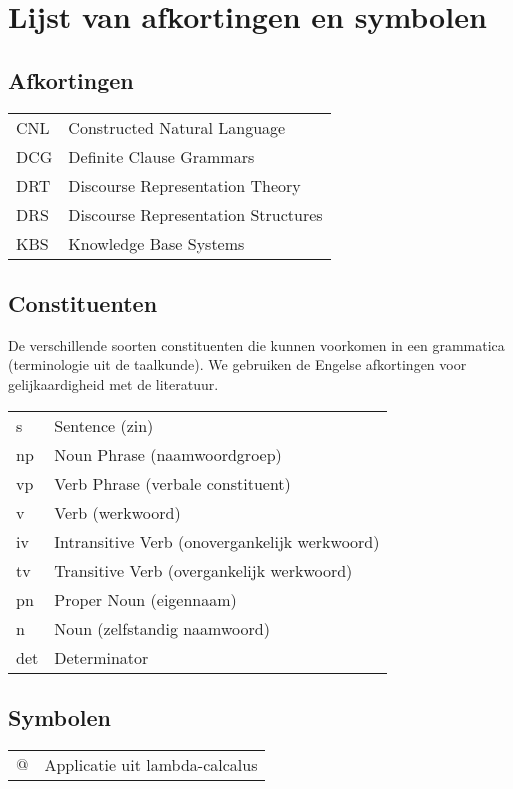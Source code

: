 \chapter{Lijst van afkortingen en symbolen}
\section*{Afkortingen}
\begin{flushleft}
  \renewcommand{\arraystretch}{1.1}
  \begin{tabularx}{\textwidth}{@{}p{12mm}X@{}}
    CNL   & Constructed Natural Language \\
    DCG   & Definite Clause Grammars \\
    DRT   & Discourse Representation Theory \\
    DRS   & Discourse Representation Structures \\
    KBS   & Knowledge Base Systems \\
  \end{tabularx}
\end{flushleft}
\section*{Constituenten}
De verschillende soorten constituenten die kunnen voorkomen in een grammatica (terminologie uit de taalkunde). We gebruiken de Engelse afkortingen voor gelijkaardigheid met de literatuur.
\begin{flushleft}
  \renewcommand{\arraystretch}{1.1}
  \begin{tabularx}{\textwidth}{@{}p{12mm}X@{}}
    s     & Sentence (zin) \\
    np    & Noun Phrase (naamwoordgroep) \\
    vp    & Verb Phrase (verbale constituent) \\
    v     & Verb (werkwoord) \\
    iv    & Intransitive Verb (onovergankelijk werkwoord) \\
    tv    & Transitive Verb (overgankelijk werkwoord) \\
    pn    & Proper Noun (eigennaam) \\
    n     & Noun (zelfstandig naamwoord) \\
    det   & Determinator \\
  \end{tabularx}
\end{flushleft}

\section*{Symbolen}
\begin{flushleft}
  \renewcommand{\arraystretch}{1.1}
  \begin{tabularx}{\textwidth}{@{}p{12mm}X@{}}
    $@$   & Applicatie uit lambda-calcalus \\
  \end{tabularx}
\end{flushleft}
